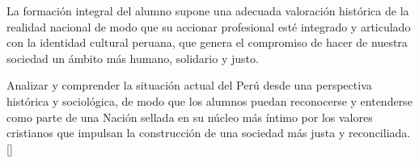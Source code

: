 \begin{syllabus}


\begin{justification}
La formación integral del alumno supone una adecuada valoración histórica de la realidad nacional de modo que su accionar profesional esté integrado y articulado con la identidad cultural peruana, que genera el compromiso de hacer de nuestra sociedad un ámbito más humano, solidario y justo.
\end{justification}

\begin{goals}
\item Analizar y comprender la situación actual del Perú desde una perspectiva histórica y sociológica, de modo que los alumnos puedan reconocerse y entenderse como parte de una Nación sellada en su núcleo más íntimo por los valores cristianos que impulsan la construcción de una sociedad más justa y reconciliada.  [\Familiarity]
\end{goals}

\begin{outcomes}
    \item {}
    \item {}
\end{outcomes}

\begin{competences}
    \item {}
\end{competences}


\end{syllabus}
